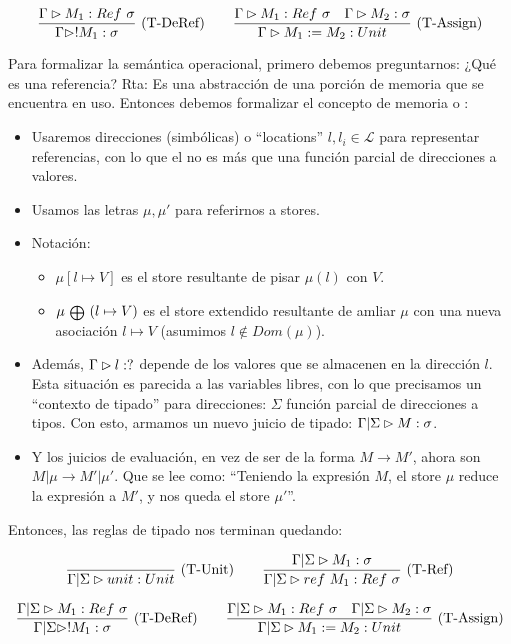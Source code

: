 \[\deriv{\Gtipa{M_1}{Ref\ \sigma}}{\Gtipa{!M_1}{\sigma}}{T-DeRef}\quad\quad \deriv{\Gtipa{M_1}{Ref\ \sigma}\quad \Gtipa{M_2}{\sigma}}{\Gtipa{M_1 := M_2}{Unit}}{T-Assign}\]

Para formalizar la semántica operacional, primero debemos preguntarnos: ¿Qué es una referencia? Rta: Es una abstracción de una porción de memoria que se encuentra en uso. Entonces debemos formalizar el concepto de memoria o :

\begin{itemize}
  \item Usaremos direcciones (simbólicas) o ``locations'' $l, l_i \in \mathcal{L}$ para representar referencias, con lo que el  no es más que una función parcial de direcciones a valores.
  \item Usamos las letras $\mu, \mu'$ para referirnos a stores.
  \item Notación:
    \begin{itemize}
      \item $\mu[l \mapsto V]$ es el store resultante de pisar $\mu(l)$ con $V$.
      \item $\mu\ {\scriptstyle \medoplus}\ (l \mapsto V)$ es el store extendido resultante de amliar $\mu$ con una nueva asociación $l \mapsto V$ (asumimos $l \notin Dom(\mu)$).
    \end{itemize}
  \item Además, $\Gamma \rhd l : ?$ depende de los valores que se almacenen en la dirección $l$. Esta situación es parecida a las variables libres, con lo que precisamos un ``contexto de tipado'' para direcciones: $\Sigma$ función parcial de direcciones a tipos. Con esto, armamos un nuevo juicio de tipado: $\Gamma|\Sigma \rhd M : \sigma$.
  \item Y los juicios de evaluación, en vez de ser de la forma $M \to M'$, ahora son  $M \vert \mu \to M' \vert \mu'$. Que se lee como: ``Teniendo la expresión $M$, el store $\mu$ reduce la expresión a $M'$, y nos queda el store $\mu'$''.
\end{itemize}

Entonces, las reglas de tipado nos terminan quedando:

\[\deriv{}{\GStipa{unit}{Unit}}{T-Unit}\quad\quad \deriv{\GStipa{M_1}{\sigma}}{\GStipa{ref\ M_1}{Ref\ \sigma}}{T-Ref}\]

\[\deriv{\GStipa{M_1}{Ref\ \sigma}}{\GStipa{!M_1}{\sigma}}{T-DeRef}\quad\quad \deriv{\GStipa{M_1}{Ref\ \sigma}\quad \GStipa{M_2}{\sigma}}{\GStipa{M_1 := M_2}{Unit}}{T-Assign}\]

